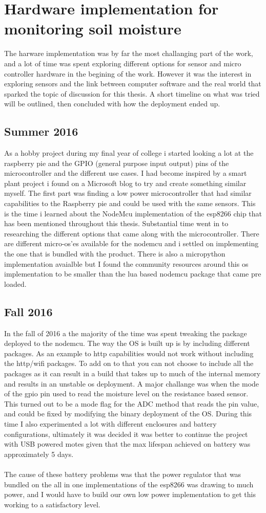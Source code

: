 \documentclass[]{uiophd}
\begin{document}
  
\section{Hardware implementation for monitoring soil moisture}
The harware implementation was by far the most challanging part of the work, and a lot of time was spent exploring different options for sensor and micro controller hardware in the begining of the work. However it was the interest in exploring sensors and the link between computer software and the real world that sparked the topic of discussion for this thesis. A short timeline on what was tried will be outlined, then concluded with how the deployment ended up.
\subsection{Summer 2016}
As a hobby project during my final year of college i started looking a lot at the raspberry pie and the GPIO (general purpose input output) pins of the microcontroller and the different use cases. I had become inspired by a smart plant project i found on a Microsoft blog to try and create something similar myself. The first part was finding a low power microcontroller that had similar capabilities to the Raspberry pie and could be used with the same sensors. This is the time i learned about the NodeMcu implementation of the esp8266 chip that has been mentioned throughout this thesis. Substantial time went in to researching the different options that came along with the microcontroller. There are different micro-os'es available for the nodemcu and i settled on implementing the one that is bundled with the product. There is also a micropython implementation avaialble but I found the community resources around this os implementation to be smaller than the lua based nodemcu package that came pre loaded.
\subsection{Fall 2016}
In the fall of 2016 a the majority of the time was spent tweaking the package deployed to the nodemcu. The way the OS is built up is by including different packages. As an example to http capabilities would not work without including the http/wifi packages. To add on to that you can not choose to include all the packages as it can result in a build that takes up to much of the internal memory and results in an unstable os deployment. A major challange was when the mode of the gpio pin used to read the moisture level on the resistance based sensor. This turned out to be a mode flag for the ADC method that reads the pin value, and could be fixed by modifying the binary deployment of the OS. During this time I also experimented a lot with different enclosures and battery configurations, ultimately it was decided it was better to continue the project with USB powered motes given that the max lifespan achieved on battery was approximately 5 days.
\\\\
The cause of these battery problems was that the power regulator that was bundled on the all in one implementations of the esp8266 was drawing to much power, and I would have to build our own low power implementation to get this working to a satisfactory level.
\end{document}
